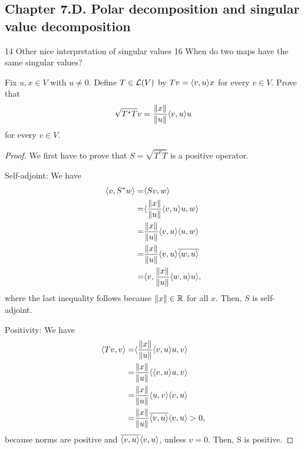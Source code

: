\subsection*{Chapter 7.D. Polar decomposition and singular value decomposition}

14 Other nice interpretation of singular values 
16 When do two maps have the same singular values?


\begin{exercise}{1}
  Fix $u,x\in V$ with $u\neq 0$. Define $T\in\mathcal{L}(V)$ by $Tv =\langle v,u\rangle x$ for every $v\in V$. Prove that
  \[
  \sqrt{T^\ast T}v=\frac{\left\lVert x\right\rVert}{\left\lVert u\right\rVert}\langle v,u\rangle u
  \]
  for every $v\in V$.
\end{exercise}
\begin{proof}
 We first have to prove that $S=\sqrt{T^\ast T}$ is a positive operator.
 
 Self-adjoint: We have 
 \begin{align*}
     \langle v, S^\ast w\rangle =& \langle Sv, w\rangle\\
     =& \langle \frac{\left\lVert x\right\rVert}{\left\lVert u\right\rVert}\langle v,u\rangle u, w\rangle\\
     =& \frac{\left\lVert x\right\rVert}{\left\lVert u\right\rVert}\langle v,u\rangle\langle u, w\rangle\\
     =& \frac{\left\lVert x\right\rVert}{\left\lVert u\right\rVert}\langle v,u\rangle\overline{\langle w, u\rangle}\\
     =& \langle v,\frac{\left\lVert x\right\rVert}{\left\lVert u\right\rVert}\langle w, u\rangle u\rangle,
 \end{align*}
 where the last inequality follows because $\left\lVert x\right\rVert\in\mathbb{R}$ for all $x$. Then, $S$ is self-adjoint.

 Positivity: We have
 \begin{align*}
     \langle Tv,v\rangle =& \langle \frac{\left\lVert x\right\rVert}{\left\lVert u\right\rVert}\langle v,u\rangle u,v\rangle\\
     =& \frac{\left\lVert x\right\rVert}{\left\lVert u\right\rVert}\langle \langle v,u\rangle u,v\rangle\\
     =& \frac{\left\lVert x\right\rVert}{\left\lVert u\right\rVert}\langle u,v\rangle\langle v,u\rangle\\
     =& \frac{\left\lVert x\right\rVert}{\left\lVert u\right\rVert}\overline{\langle v,u\rangle}\langle v,u\rangle>0,
 \end{align*}
 because norms are positive and $\overline{\langle v,u\rangle}\langle v,u\rangle$, unless $v=0$. Then, S is positive.
 

\end{proof}
